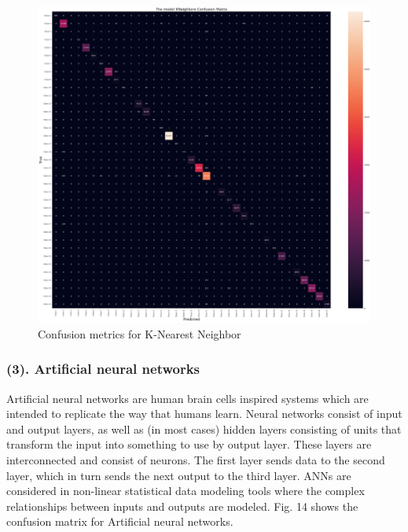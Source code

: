 \documentclass[10 pt,conference,final,]{IEEEtran}
\begin{document}
\begin{figure}

{\centering \includegraphics[width=0.9\linewidth]{img/fig13} 

}

\caption{Confusion metrics for K-Nearest Neighbor}\label{fig:unnamed-chunk-13}
\end{figure}

\subsubsection{(3). Artificial neural
networks}\label{artificial-neural-networks}

Artificial neural networks are human brain cells inspired systems which
are intended to replicate the way that humans learn. Neural networks
consist of input and output layers, as well as (in most cases) hidden
layers consisting of units that transform the input into something to
use by output layer. These layers are interconnected and consist of
neurons. The first layer sends data to the second layer, which in turn
sends the next output to the third layer. ANNs are considered in
non-linear statistical data modeling tools where the complex
relationships between inputs and outputs are modeled. Fig. 14 shows the
confusion matrix for Artificial neural networks.
\end{document}
